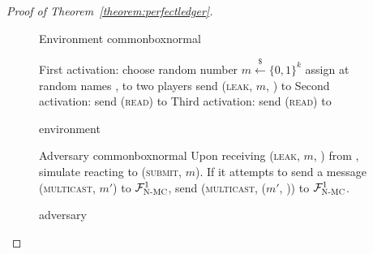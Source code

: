 \begin{proof}[Proof of Theorem~\ref{theorem:perfectledger}]
\begin{figure}
\begin{titlebox}{Environment \normalfont \perfectenv}{commonbox}{normal}
\begin{algorithmic}[1]
            \State First activation:
            \Indent
              \State choose random number $m \overset{\$}{\gets} \{0, 1\}^k$
              \State assign at random names \alice, \bob{} to two players
              \State send (\textsc{leak}, $m$, \alice) to \adversary{}
            \EndIndent
            \State Second activation:
            \Indent
              \State send (\textsc{read}) to \bob
            \EndIndent
            \State Third activation:
            \Indent
                \State {} 
                \label{fig:perfectledger:env:coin1:real1}
                \State {} 
                \label{fig:perfectledger:env:coin1:ideal1}
              \EndIf
              \State send (\textsc{read}) to \alice
                \State {} 
                \label{fig:perfectledger:env:coin1:real3}
                \State {} 
                \label{fig:perfectledger:env:coin1:real2}
                \State {} 
                \label{fig:perfectledger:env:coin1:ideal2}
              \EndIf
            \EndIndent
          \EndProcedure
        \end{algorithmic}
      \end{titlebox}
      \caption{\perfectenv environment}
      \label{fig:perfectledger:env}
    \end{figure}

    \begin{figure}[H]
      \begin{titlebox}{Adversary \normalfont \perfectadv}{commonbox}{normal}
        Upon receiving (\textsc{leak}, $m$, \alice) from \perfectenv, simulate
        \perfectprot{} reacting to (\textsc{submit}, $m$). If it attempts to
        send a message (\textsc{multicast}, $m'$) to $\mathcal{F}_{\textsc{N-MC}}^1$, send
        (\textsc{multicast}, ($m'$, \alice)) to $\mathcal{F}_{\textsc{N-MC}}^1$.
      \end{titlebox}
      \caption{\perfectadv adversary}
      \label{fig:perfectledger:adv}
    \end{figure}


\end{proof}
